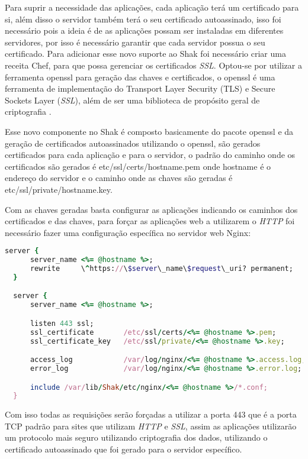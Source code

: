 Para suprir a necessidade das aplicações, cada aplicação terá um certificado para
si, além disso o servidor também terá o seu certificado autoassinado, isso foi necessário
pois a ideia é de as aplicações possam ser instaladas em diferentes servidores, por
isso é necessário garantir que cada servidor possua o seu certificado. Para adicionar
esse novo suporte ao Shak foi necessário criar uma receita Chef,
para que possa gerenciar os certificados \textit{SSL}. Optou-se por utilizar a ferramenta
openssl para geração das chaves e certificados, o openssl é uma ferramenta de
implementação do Transport Layer Security (TLS) e Secure Sockets Layer (\textit{SSL}),
além de ser uma biblioteca de propósito geral de criptografia \cite{openssl}.

Esse novo componente no Shak é composto basicamente do pacote openssl e da geração
de certificados autoassinados utilizando o openssl, são gerados certificados
para cada aplicação e para o servidor, o padrão do caminho onde os certificados são
gerados é etc/ssl/certs/hostname.pem onde hostname é o endereço do servidor
e o caminho onde as chaves são geradas é etc/ssl/private/hostname.key.

Com as chaves geradas basta configurar as aplicações indicando os caminhos dos certificados
e das chaves, para forçar as aplicações web a utilizarem o \textit{HTTP} foi necessário fazer
uma configuração específica no servidor web Nginx:


\begin{lstlisting}[language=Ruby,label=dice_index,caption={Exemplo de arquivo de configuração do Nginx para aplicações web no shak}]
  server {
      server_name <%= @hostname %>;
      rewrite     \^https://\$server\_name\$request\_uri? permanent;
  }

  server {
      server_name <%= @hostname %>;

      listen 443 ssl;
      ssl_certificate       /etc/ssl/certs/<%= @hostname %>.pem;
      ssl_certificate_key   /etc/ssl/private/<%= @hostname %>.key;

      access_log            /var/log/nginx/<%= @hostname %>.access.log;
      error_log             /var/log/nginx/<%= @hostname %>.error.log;

      include /var/lib/Shak/etc/nginx/<%= @hostname %>/*.conf;
  }
\end{lstlisting}

Com isso todas as requisições serão forçadas a utilizar a porta 443 que é a porta
TCP padrão para sites que utilizam \textit{HTTP} e \textit{SSL}, assim as aplicações utilizarão
um protocolo mais seguro utilizando criptografia dos dados, utilizando o
certificado autoassinado que foi gerado para o servidor específico.

